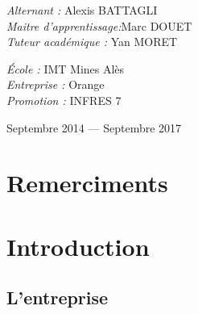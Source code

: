 \documentclass[12pt,a4paper]{report}
\begin{document}
\begin{titlepage}
\begin{center}
    \begin{minipage}{0.55\textwidth}
      \begin{flushleft} \large
        \emph{Alternant :} Alexis \textsc{BATTAGLI}\\
        \emph{Maitre d'apprentissage:}Marc \textsc{DOUET}\\
        \emph{Tuteur académique : } Yan \textsc{MORET}
      \end{flushleft}
    \end{minipage}
    \begin{minipage}{0.4\textwidth}
      \begin{flushright} \large
      	\emph{École :} IMT Mines Alès\\
       	\emph{Entreprise :} Orange\\
        \emph{Promotion :} INFRES 7\\
      \end{flushright}
    \end{minipage}

    \vfill

    {\large Septembre 2014 — Septembre 2017}

  \end{center}
\end{titlepage}

\newpage
\tableofcontents

\newpage
\listoffigures

\newpage
\listoftables

\newpage
\printnoidxglossary[type=\acronymtype]

\newpage
\section*{Remerciments}

\newpage
\section{Introduction}
\subsection{L'entreprise}
\end{document}
